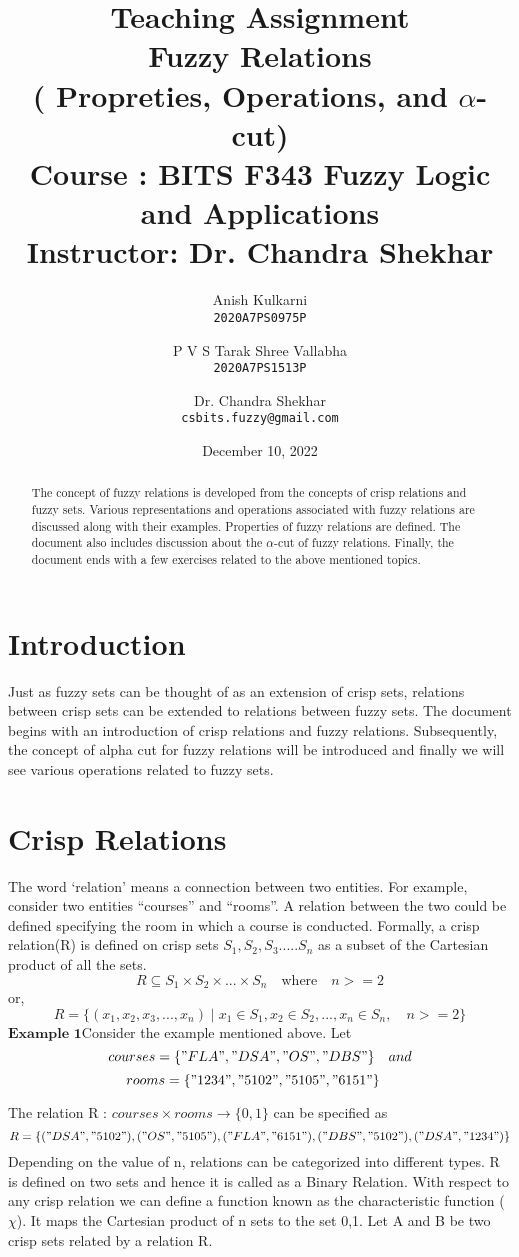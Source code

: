 \documentclass{article}
\title{%
Teaching Assignment\\
\vspace{0.5cm}
  \textbf{Fuzzy Relations}\\
  \large ( Propreties, Operations, and $\alpha$-cut)\\
  \vspace{0.8cm}
  Course : BITS F343 Fuzzy Logic and Applications\\
  \vspace{0.1cm}
  Instructor: Dr. Chandra Shekhar 
  \vspace{0.5cm}
  }
\author{
  Anish Kulkarni\\
  \texttt{2020A7PS0975P}
  \and
  P V S Tarak Shree Vallabha\\
  \texttt{2020A7PS1513P}
  \and
  Dr. Chandra Shekhar\\
  \texttt{csbits.fuzzy@gmail.com}
\vspace{0.6cm}
}
\date{December 10, 2022}
\begin{document}
\maketitle

\begin{abstract}
The concept of fuzzy relations is developed from the concepts of crisp relations and fuzzy sets. Various representations and operations associated with fuzzy relations are discussed along with their examples. Properties of fuzzy relations are defined. The document also includes discussion about the $\alpha$-cut of fuzzy relations. Finally, the document ends with a few exercises related to the above mentioned topics. 
\end{abstract}

\section{Introduction}

Just as fuzzy sets can be thought of as an extension of crisp sets, relations between crisp sets can be extended to relations between fuzzy sets. The document begins with an introduction of crisp relations and fuzzy relations. Subsequently, the concept of alpha cut for fuzzy relations will be introduced and finally we will see various operations related to fuzzy sets.

\section{Crisp Relations}
The word ‘relation’ means a connection between two entities. For example, consider two entities “courses” and “rooms”. A relation between the two could be defined specifying the room in which a course is conducted. Formally, a crisp relation(R) is defined on crisp sets $S_1, S_2, S_3.....S_n$ as a subset of the Cartesian product of all the sets.
\[R\subseteq S_1 \times S_2 \times...\times S_n \quad \textrm{where} \quad n>=2\]or,
\[R = \{(x_1,x_2,x_3,...,x_n) \mid x_1\in S_1 , x_2\in S_2,...,x_n\in S_n,\quad n>=2 \} \]$\textbf{Example 1}$\newline Consider the example mentioned above. Let
\[courses=\{"FLA","DSA","OS","DBS"\}\quad and\]
\[rooms=\{"1234","5102","5105","6151"\}\quad \]

The relation R : $courses \times rooms \rightarrow \{0,1\}$ can be specified as 
\[R = \{("DSA","5102"),("OS","5105"),("FLA","6151"),("DBS","5102"),("DSA","1234")\} \]
Depending on the value of n, relations can be categorized into different types. R is defined on two sets and hence it is called as a Binary Relation.\newline
With respect to any crisp relation we can define a function known as the characteristic function ($\chi$). It maps the Cartesian product of n sets to the set {0,1}. Let A and B be two crisp sets related by a relation R.
\end{document}
